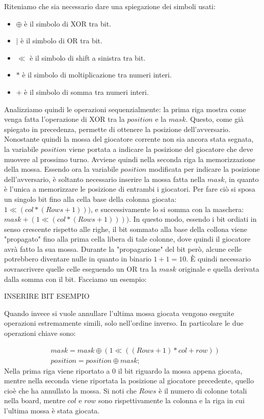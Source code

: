 \documentclass[a4paper]{article}
\begin{document}
Riteniamo che sia necessario dare una spiegazione dei simboli usati:
\begin{itemize}
  \item $\oplus$ è il simbolo di XOR tra bit.
  \item $|$ è il simbolo di OR tra bit.
  \item $\ll$ è il simbolo di shift a sinistra tra bit.
  \item $*$ è il simbolo di moltiplicazione tra numeri interi.
  \item $+$ è il simbolo di somma tra numeri interi.
\end{itemize}
Analizziamo quindi le operazioni sequenzialmente: la prima riga mostra come
venga fatta l'operazione di XOR tra la $position$ e la $mask$. Questo, come già
spiegato in precedenza, permette di ottenere la posizione dell'avversario. 
Nonostante quindi la mossa del giocatore corrente non sia ancora stata segnata, 
la variabile $position$ viene portata a indicare la posizione del giocatore che 
deve muovere al prossimo turno. Avviene quindi nella seconda riga la 
memorizzazione della mossa. Essendo ora la variabile $position$ modificata per
indicare la posizione dell'avversario, è soltanto necessario inserire la mossa
fatta nella $mask$, in quanto è l'unica a memorizzare le posizione di entrambi i 
giocatori. Per fare ciò si sposa un singolo bit fino alla cella base della 
colonna giocata: $1 \ll (col * (Rows + 1)))$, e successivamente lo si somma con
la maschera: $mask + (1 \ll (col * (Rows + 1))))$. In questo modo, essendo i
bit ordiati in senso crescente rispetto alle righe, il bit sommato alla base 
della collona viene "propagato" fino alla prima cella libera di tale colonne, 
dove quindi il giocatore avrà fatto la sua mossa. Durante la "propagazione" del
bit però, alcune celle potrebbero diventare nulle in quanto in binario $1 + 1 = 
10$. È quindi necessario sovrascrivere quelle celle eseguendo un OR tra la 
$mask$ originale e quella derivata dalla somma con il bit. Facciamo un esempio:
\begin{center}
  INSERIRE BIT ESEMPIO
\end{center}

Quando invece si vuole annullare l'ultima mossa giocata vengono eseguite operazioni
estremamente simili, solo nell'ordine inverso. In particolare le due operazioni
chiave sono:

\begin{align*}
  &mask = mask \oplus (1 \ll ((Rows + 1) * col + row))\\
  &position = position \oplus mask;
\end{align*}
Nella prima riga viene riportato a 0 il bit riguardo la mossa appena giocata,
mentre nella seconda viene riportata la posizione al giocatore precedente, 
quello cioè che ha annullato la mossa. Si noti che $Rows$ è il numero di colonne
totali nella board, mentre $col$ e $row$ sono rispettivamente la colonna e la
riga in cui l'ultima mossa è stata giocata.
\end{document}
